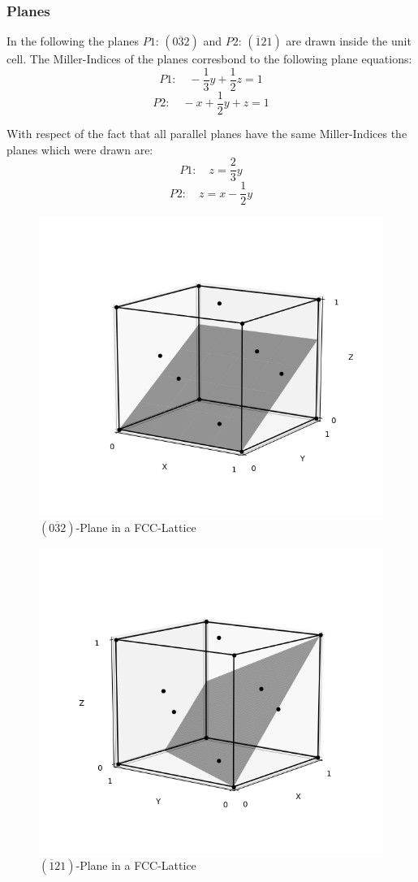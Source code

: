 \subsubsection*{Planes}

In the following the planes $P1: \, (0\overline{3}2)$ and $P2: \,(\overline{1}21)$ are drawn inside the unit cell.
The Miller-Indices of the planes corresbond to the following plane equations:
$$P1: \quad -\frac{1}{3} y + \frac{1}{2} z = 1$$
$$P2: \quad -x +\frac{1}{2} y + z = 1$$

With respect of the fact that all parallel planes have the same Miller-Indices the planes which were drawn are:
$$P1: \quad z = \frac{2}{3}y$$
$$P2: \quad z = x -\frac{1}{2}y$$

\begin{figure}[H]
	\centering
	\includegraphics[width=0.6\linewidth]{Graphics/Chapter1/PLANE032}
	\caption{$(0\overline{3}2)$-Plane in a FCC-Lattice}
	\label{}
\end{figure}


\begin{figure}[H]
	\centering
	\includegraphics[width=0.6\linewidth]{Graphics/Chapter1/PLANE121}
	\caption{$(\overline{1}21)$-Plane in a FCC-Lattice}
	\label{}
\end{figure}


